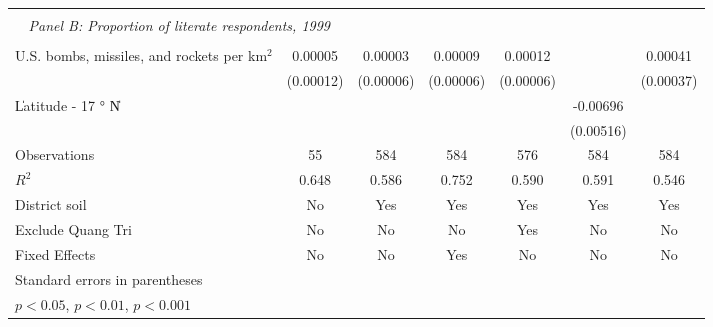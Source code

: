 \begin{table}[htbp]
\begin{tabular}{l*{6}{c}}
\hline \\ \multicolumn{2}{c}{\emph{Panel B: Proportion of literate respondents, 1999}} \\\\[-1ex]
U.S. bombs, missiles, and rockets per km$^2$&     0.00005         &     0.00003         &     0.00009         &     0.00012\sym{*}  &                     &     0.00041         \\
                    &   (0.00012)         &   (0.00006)         &   (0.00006)         &   (0.00006)         &                     &   (0.00037)         \\
[1em]
\|Latitude - 17 $°$ N\|&                     &                     &                     &                     &    -0.00696         &                     \\
                    &                     &                     &                     &                     &   (0.00516)         &                     \\
\hline
Observations        &          55         &         584         &         584         &         576         &         584         &         584         \\
\(R^{2}\)           &       0.648         &       0.586         &       0.752         &       0.590         &       0.591         &       0.546         \\
District soil       &          No         &         Yes         &         Yes         &         Yes         &         Yes         &         Yes         \\
Exclude Quang Tri   &          No         &          No         &          No         &         Yes         &          No         &          No         \\
Fixed Effects       &          No         &          No         &         Yes         &          No         &          No         &          No         \\
\hline\hline \multicolumn{5}{l}{\footnotesize Standard errors in parentheses}\\\multicolumn{3}{l}{\footnotesize \sym{*} \(p<0.05\), \sym{**} \(p<0.01\), \sym{***} \(p<0.001\)}\\ \end{tabular} \\ \end{table}
